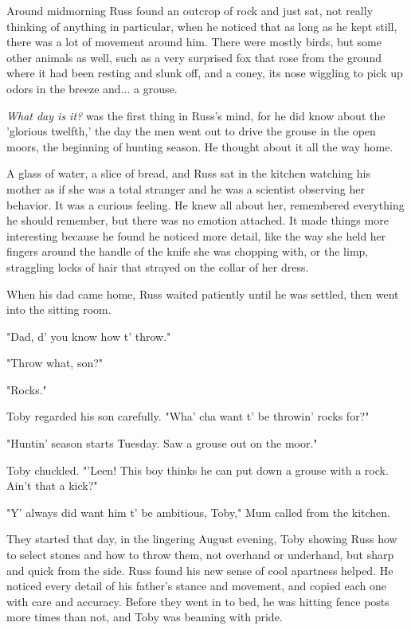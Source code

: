 \documentclass[a4paper,11pt]{article}
\begin{document}
Around midmorning Russ found an outcrop of rock and just sat, not really thinking of anything in particular, when he noticed that as long as he kept still, there was a lot of movement around him. There were mostly birds, but some other animals as well, such as a very surprised fox that rose from the ground where it had been resting and slunk off, and a coney, its nose wiggling to pick up odors in the breeze and... a grouse.

\emph{What day is it?} was the first thing in Russ's mind, for he did know about the 'glorious twelfth,' the day the men went out to drive the grouse in the open moors, the beginning of hunting season. He thought about it all the way home.

A glass of water, a slice of bread, and Russ sat in the kitchen watching his mother as if she was a total stranger and he was a scientist observing her behavior. It was a curious feeling. He knew all about her, remembered everything he should remember, but there was no emotion attached. It made things more interesting because he found he noticed more detail, like the way she held her fingers around the handle of the knife she was chopping with, or the limp, straggling locks of hair that strayed on the collar of her dress.

When his dad came home, Russ waited patiently until he was settled, then went into the sitting room.

"Dad, d' you know how t' throw."

"Throw what, son?"

"Rocks."

Toby regarded his son carefully. "Wha' cha want t' be throwin' rocks for?"

"Huntin' season starts Tuesday. Saw a grouse out on the moor."

Toby chuckled. "'Leen! This boy thinks he can put down a grouse with a rock. Ain't that a kick?"

"Y' always did want him t' be ambitious, Toby," Mum called from the kitchen.

They started that day, in the lingering August evening, Toby showing Russ how to select stones and how to throw them, not overhand or underhand, but sharp and quick from the side. Russ found his new sense of cool apartness helped. He noticed every detail of his father's stance and movement, and copied each one with care and accuracy. Before they went in to bed, he was hitting fence posts more times than not, and Toby was beaming with pride.
\end{document}
